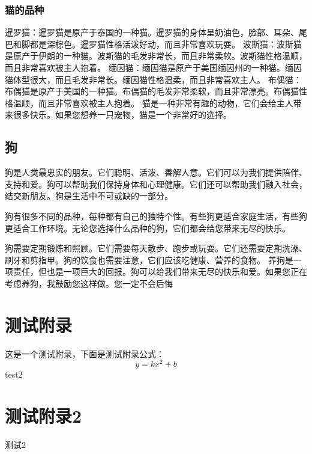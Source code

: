\documentclass[engineeringmaster]{hquThesis}
\begin{document}
\subsection{猫的品种}
暹罗猫：暹罗猫是原产于泰国的一种猫。暹罗猫的身体呈奶油色，脸部、耳朵、尾巴和脚都是深棕色。暹罗猫性格活泼好动，而且非常喜欢玩耍。
波斯猫：波斯猫是原产于伊朗的一种猫。波斯猫的毛发非常长，而且非常柔软。波斯猫性格温顺，而且非常喜欢被主人抱着。
缅因猫：缅因猫是原产于美国缅因州的一种猫。缅因猫体型很大，而且毛发非常长。缅因猫性格温柔，而且非常喜欢主人。
布偶猫：布偶猫是原产于美国的一种猫。布偶猫的毛发非常柔软，而且非常漂亮。布偶猫性格温顺，而且非常喜欢被主人抱着。
猫是一种非常有趣的动物，它们会给主人带来很多快乐。如果您想养一只宠物，猫是一个非常好的选择。

\section{狗}
狗是人类最忠实的朋友。它们聪明、活泼、善解人意。它们可以为我们提供陪伴、支持和爱。狗可以帮助我们保持身体和心理健康。它们还可以帮助我们融入社会，结交新朋友。狗是生活中不可或缺的一部分。

狗有很多不同的品种，每种都有自己的独特个性。有些狗更适合家庭生活，有些狗更适合工作环境。无论您选择什么品种的狗，它们都会给您带来无尽的快乐。

狗需要定期锻炼和照顾。它们需要每天散步、跑步或玩耍。它们还需要定期洗澡、刷牙和剪指甲。狗的饮食也需要注意，它们应该吃健康、营养的食物。
养狗是一项责任，但也是一项巨大的回报。狗可以给我们带来无尽的快乐和爱。如果您正在考虑养狗，我鼓励您这样做。您一定不会后悔

\appendix

\chapter{测试附录}
这是一个测试附录，下面是测试附录公式：
\begin{equation}
y = kx^2 + b
\end{equation}
test2
\chapter{测试附录2}
测试2
\end{document}
